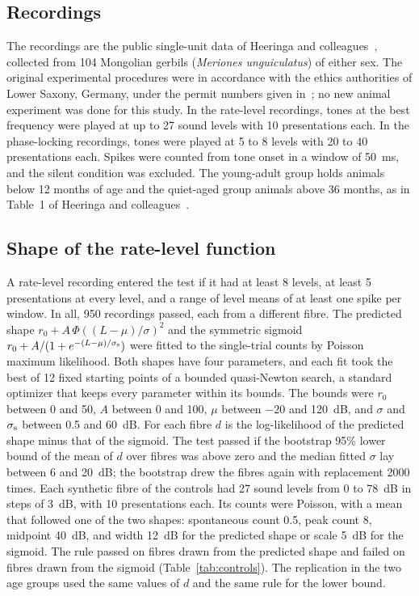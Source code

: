 \subsection{Recordings}
The recordings are the public single-unit data of Heeringa and colleagues~\cite{Heeringa2024}, collected from 104 Mongolian gerbils
(\emph{Meriones unguiculatus}) of either sex. The original experimental procedures were in accordance with the ethics authorities of
Lower Saxony, Germany, under the permit numbers given in~\cite{Heeringa2024}; no new animal experiment was done for this study. In
the rate-level recordings, tones at the best frequency were played at up to 27 sound levels with 10 presentations each. In the
phase-locking recordings, tones were played at 5 to 8 levels with 20 to 40 presentations each. Spikes were counted from tone onset in
a window of 50~ms, and the silent condition was excluded. The young-adult group holds animals below 12 months of age and the
quiet-aged group animals above 36 months, as in Table~1 of Heeringa and colleagues~\cite{Heeringa2024}.

\subsection{Shape of the rate-level function}
A rate-level recording entered the test if it had at least 8 levels, at least 5 presentations at every level, and a range of level
means of at least one spike per window. In all, 950 recordings passed, each from a different fibre. The predicted shape $r_0+A\,\Phi((L-\mu)/\sigma)^2$ and the symmetric
sigmoid $r_0+A/(1+e^{-(L-\mu)/\sigma_{\rm s}})$ were fitted to the single-trial counts by Poisson maximum likelihood. Both shapes have four parameters, and each fit took the best of 12 fixed
starting points of a bounded quasi-Newton search, a standard optimizer that keeps every parameter within its bounds. The bounds were $r_0$ between 0 and 50, $A$ between 0 and 100, $\mu$ between $-20$
and 120~dB, and $\sigma$ and $\sigma_{\rm s}$ between 0.5 and 60~dB. For each fibre $d$ is the log-likelihood of the predicted shape minus that of the sigmoid.
The test passed if the bootstrap 95\% lower bound of the mean of $d$ over fibres was above zero and the median fitted $\sigma$ lay
between 6 and 20~dB; the bootstrap drew the fibres again with replacement 2000 times. Each synthetic fibre of the controls had 27
sound levels from 0 to 78~dB in steps of 3~dB, with 10 presentations each. Its counts were Poisson, with a mean that followed one of
the two shapes: spontaneous count 0.5, peak count 8, midpoint 40~dB, and width 12~dB for the predicted shape or scale 5~dB for the
sigmoid. The rule
passed on fibres drawn from the predicted shape and failed on fibres drawn from the sigmoid (Table~\ref{tab:controls}). The replication in the two age
groups used the same values of $d$ and the same rule for the lower bound.

